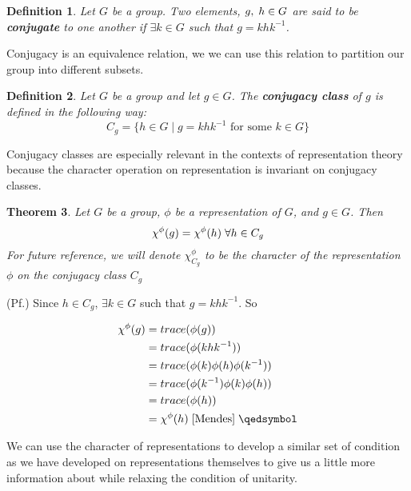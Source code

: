 \documentclass[10pt]{ucthesis}
\newtheorem{definition}{Definition}[chapter]
\newtheorem{theorem}[definition]{Theorem}
\begin{document}
\begin{definition}
	Let $G$ be a group. Two elements, $g,\hspace{1mm}h \in G$ are said to be \textbf{conjugate} to one another if $\exists k \in G$ such that $g = khk^{-1}$.
\end{definition}

Conjugacy is an equivalence relation, we we can use this relation to partition our group into different subsets.

\begin{definition}
	Let $G$ be a group and let $g \in G$. The \textbf{conjugacy class} of $g$ is defined in the following way:
$$C_g = \{h\in G \mid g = khk^{-1} \text{ for some } k \in G \}$$
\end{definition}

Conjugacy classes are especially relevant in the contexts of representation theory because the character operation on representation is invariant on conjugacy classes.

\begin{theorem}
	Let $G$ be a group, $\phi$ be a representation of $G$, and $g\in G$. Then 
$$\chi^\phi(g) = \chi^\phi(h) \hspace{1mm}\forall h \in C_g$$
For future reference, we will denote $\chi^\phi_{C_g}$ to be the character of the representation $\phi$ on the conjugacy class $C_g$
\end{theorem}
\noindent (Pf.) Since $h\in C_g$, $\exists k\in G$ such that $g = khk^{-1}$. So 

\begin{equation}
	\begin{aligned}
		\chi^\phi(g) &= trace(\phi(g)) \\
					&= trace(\phi(khk^{-1}))\\ 
					&= trace(\phi(k)\phi(h)\phi(k^{-1})) \\
					&= trace(\phi(k^{-1})\phi(k)\phi(h)) \\
					&= trace(\phi(h)) \\
					&= \chi^\phi(h) \hspace{1mm}\cite{Mendes}\hspace{1mm} \qedsymbol
	\end{aligned}
\end{equation}

We can use the character of representations to develop a similar set of condition as we have developed on representations themselves to give us a little more information about while relaxing the condition of unitarity.
\end{document}

